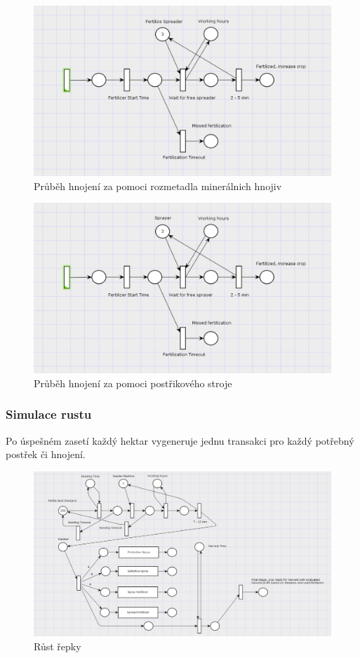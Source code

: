 \documentclass[11pt,a4paper,titlepage]{article}
\begin{document}
\begin{figure}[ht!]
\centering
\includegraphics[scale=0.3]{img/FertilizationSpread.png}
\caption{Průběh hnojení za pomoci rozmetadla minerálnich hnojiv}
\end{figure}

\begin{figure}[ht!]
\centering
\includegraphics[scale=0.3]{img/FertilizationSpray.png}
\caption{Průběh hnojení za pomoci postřikového stroje}
\end{figure}

\pagebreak

\subsubsection{Simulace rustu}
Po úspešném zasetí každý hektar vygeneruje jednu transakci pro každý potřebný postřek či hnojení.

\begin{figure}[ht!]
\centering
\includegraphics[scale=0.25]{img/Growing.png}
\caption{Růst řepky}
\end{figure}
\end{document}
